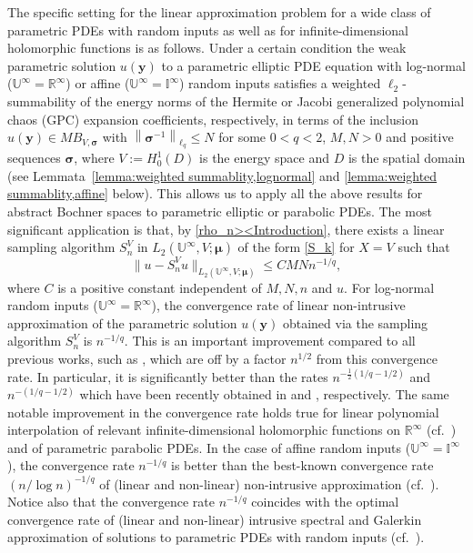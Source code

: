\documentclass[11pt]{article}
\numberwithin{equation}{section}
\theoremstyle{definition}
\theoremstyle{remark}
\newcommand{\norm}[2]{\left\|{#1}\right\|_{#2}}
\newcommand{\by}{{\boldsymbol{y}}}
\newcommand{\bsigma}{{\boldsymbol{\sigma}}}
\newcommand{\bmu}{{\boldsymbol{\mu}}}
\def\IIi{{\mathbb I}^\infty}
\def\RRi{{\mathbb R}^\infty}
\def\UUi{{\mathbb U}^{\infty}}
\begin{document}
The specific setting for the linear  approximation problem for a wide class of parametric PDEs with random inputs as well as for infinite-dimensional holomorphic functions is as follows.
Under a certain condition the weak parametric solution $u(\by)$ to a parametric elliptic PDE equation with log-normal ($\UUi=\RRi$) or affine 
($\UUi=\IIi$) random inputs satisfies a weighted $\ell_2$-summability of the energy norms of the Hermite or Jacobi generalized polynomial chaos (GPC) expansion coefficients, respectively, in terms of the inclusion 
$u(\by) \in M B_{V,\bsigma}$ with $\norm{\bsigma^{-1}}{\ell_q} \le N$ for some $0<q<2$, $M,N >0$ and {positive sequences $\bsigma$}, where $V:= H_0^1(D)$ is the energy space and $D$ is the spatial domain (see Lemmata~\ref{lemma:weighted summablity,lognormal} and \ref{lemma:weighted summablity,affine} below).
This allows us to apply all the above results for abstract Bochner spaces to parametric elliptic or parabolic PDEs.
The most significant application is that, by \eqref{rho_n><Introduction},  there exists a linear sampling algorithm $S_n^V$ in $L_2(\UUi,V;\bmu)$ of the form \eqref{S_k} for $X=V$ such that
\begin{equation*} \label{u -S_n u-Introduction}
	\|u -S_n^V u\|_{L_2(\UUi,V;\bmu)} \leq C MN n^{-1/q},
\end{equation*}
where $C$ is a positive constant independent of $M,N,n$ and $u$.
For log-normal random inputs ($\UUi= \RRi$), the convergence rate of linear non-intrusive approximation of the parametric solution $u(\by)$ obtained via the sampling algorithm $S_n^V$ is $n^{-1/q}$.
This is an important improvement compared to all previous works, such as \cite{BNT2007,Dung19,Dung21,DD-Erratum23,DNSZ2023,EST18,MNST2014,NTW2008,NTW2008a}, which are off by a factor $n^{1/2}$ from this convergence rate.
In particular, it is significantly better than the rates 
$n^{- \frac{1}{2}(1/q- 1/2)}$ and $n^{-(1/q - 1/2)}$ which have been recently obtained in
\cite[Theorem 3.18]{EST18} and \cite[Corollary 5.9]{Dung21}, respectively.
The same notable improvement in the convergence rate holds true for linear polynomial interpolation of relevant infinite-dimensional holomorphic functions on $\RRi$ (cf.\ \cite{DNSZ2023})  and of parametric parabolic PDEs.
In the case of affine random inputs ($\UUi=\IIi$), the convergence rate $n^{-1/q}$ is better than the best-known convergence rate $(n/\log n)^{-1/q}$ of (linear and non-linear) non-intrusive approximation (cf.\ \cite{ADM2024,CCMNT2015,Dung19,ZDS19}).
Notice also that the convergence rate $n^{-1/q}$ coincides with the optimal convergence rate of (linear and non-linear) intrusive spectral and Galerkin approximation of solutions to parametric PDEs with random inputs (cf.\ \cite{BCDC17,BCDM17,BCM17,Dung21}).
\end{document}
